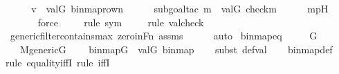 \begin{isabellebody}
\ \ \isamarkupfalse%
\ \isamarkupfalse%
\ {\isachardoublequoteopen}v\ {\isasymin}\ val{\isacharparenleft}{\kern0pt}G{\isacharcomma}{\kern0pt}\ binmap{\isacharunderscore}{\kern0pt}row{\isacharprime}{\kern0pt}{\isacharparenleft}{\kern0pt}n{\isacharparenright}{\kern0pt}{\isacharparenright}{\kern0pt}{\isachardoublequoteclose}\ \isanewline
\ \ \ \ \isamarkupfalse%
{\isacharparenleft}{\kern0pt}subgoal{\isacharunderscore}{\kern0pt}tac\ {\isachardoublequoteopen}m\ {\isacharequal}{\kern0pt}\ val{\isacharparenleft}{\kern0pt}G{\isacharcomma}{\kern0pt}\ check{\isacharparenleft}{\kern0pt}m{\isacharparenright}{\kern0pt}{\isacharparenright}{\kern0pt}{\isachardoublequoteclose}{\isacharparenright}{\kern0pt}\isanewline
\ \ \ \ \isamarkupfalse%
\ mpH\ \isanewline
\ \ \ \ \ \isamarkupfalse%
\ force\isanewline
\ \ \ \ \isamarkupfalse%
{\isacharparenleft}{\kern0pt}rule\ sym{\isacharparenright}{\kern0pt}\isanewline
\ \ \ \ \isamarkupfalse%
{\isacharparenleft}{\kern0pt}rule\ valcheck{\isacharparenright}{\kern0pt}\isanewline
\ \ \ \ \isamarkupfalse%
\ generic{\isacharunderscore}{\kern0pt}filter{\isacharunderscore}{\kern0pt}contains{\isacharunderscore}{\kern0pt}max\ zero{\isacharunderscore}{\kern0pt}in{\isacharunderscore}{\kern0pt}Fn\ assms\isanewline
\ \ \ \ \isamarkupfalse%
\ auto\isanewline
{}\isamarkupfalse%
%
\endisatagproof
{\isafoldproof}%
%
\isadelimproof
\isanewline
%
\endisadelimproof
\isanewline
{}\isamarkupfalse%
\ binmap{\isacharunderscore}{\kern0pt}eq\ {\isacharcolon}{\kern0pt}\ \isanewline
\ \ \ G\ \isanewline
\ \ \ {\isachardoublequoteopen}M{\isacharunderscore}{\kern0pt}generic{\isacharparenleft}{\kern0pt}G{\isacharparenright}{\kern0pt}{\isachardoublequoteclose}\ \isanewline
\ \ \ {\isachardoublequoteopen}binmap{\isacharparenleft}{\kern0pt}G{\isacharparenright}{\kern0pt}\ {\isacharequal}{\kern0pt}\ val{\isacharparenleft}{\kern0pt}G{\isacharcomma}{\kern0pt}\ binmap{\isacharprime}{\kern0pt}{\isacharparenright}{\kern0pt}{\isachardoublequoteclose}\ \isanewline
%
\isadelimproof
\isanewline
\ \ %
\endisadelimproof
%
\isatagproof
{}\isamarkupfalse%
{\isacharparenleft}{\kern0pt}subst\ def{\isacharunderscore}{\kern0pt}val{\isacharparenright}{\kern0pt}\isanewline
\ \ \isamarkupfalse%
\ binmap{\isacharunderscore}{\kern0pt}def\isanewline
\ \ \isamarkupfalse%
{\isacharparenleft}{\kern0pt}rule\ equality{\isacharunderscore}{\kern0pt}iffI{\isacharcomma}{\kern0pt}\ rule\ iffI{\isacharparenright}{\kern0pt}\isanewline

\end{isabellebody}
